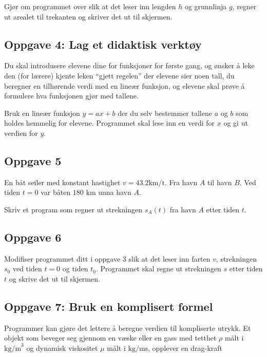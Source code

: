 \documentclass[11pt]{article}
\begin{document}
Gjør om programmet over slik at det leser inn lengden \(h\) og
grunnlinja \(g\), regner ut arealet til trekanten og skriver det ut til
skjermen.

    \hypertarget{oppgave-4-lag-et-didaktisk-verktuxf8y}{%
\subsection{Oppgave 4: Lag et didaktisk
verktøy}\label{oppgave-4-lag-et-didaktisk-verktuxf8y}}

Du skal introdusere elevene dine for funksjoner for første gang, og
ønsker å leke den (for lærere) kjente leken ``gjett regelen'' der
elevene sier noen tall, du beregner en tilhørende verdi med en lineær
funksjon, og elevene skal prøve å formulere hva funksjonen gjør med
tallene.

Bruk en lineær funksjon \(y = ax + b\) der du selv bestemmer tallene
\(a\) og \(b\) som holdes hemmelig for elevene. Programmet skal lese inn
en verdi for \(x\) og gi ut verdien for \(y\).

    \hypertarget{oppgave-5}{%
\subsection{Oppgave 5}\label{oppgave-5}}

En båt seiler med konstant hastighet \(v= 43.2 \text{km/t}\). Fra havn
\(A\) til havn \(B\). Ved tiden \(t=0\) var båten \(180 \text{ km}\)
unna havn \(A\).

Skriv et program som regner ut strekningen \(s_A(t)\) fra havn \(A\)
etter tiden \(t\).

    \hypertarget{oppgave-6}{%
\subsection{Oppgave 6}\label{oppgave-6}}

Modifiser programmet ditt i oppgave 3 slik at det leser inn farten
\(v\), strekningen \(s_0\) ved tiden \(t=0\) og tiden \(t_0\).
Programmet skal regne ut strekningen \(s\) etter tiden \(t\) og skrive
det ut til skjermen.

    \hypertarget{oppgave-7-bruk-en-komplisert-formel}{%
\subsection{Oppgave 7: Bruk en komplisert
formel}\label{oppgave-7-bruk-en-komplisert-formel}}

Programmer kan gjøre det lettere å beregne verdien til kompliserte
utrykk. Et objekt som beveger seg gjennom en væske eller en gass med
tetthet \(\rho\) målt i \(\text{kg/m}^3\) og dynamisk viskositet \(\mu\)
målt i \(\text{kg/ms}\), opplever en drag-kraft
\end{document}
